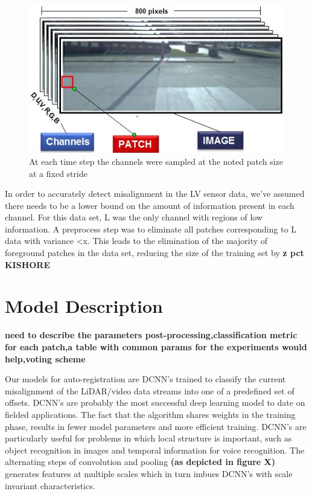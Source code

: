 \documentclass{article}
\begin{document}
\begin{figure}[htbp]
        \includegraphics[scale=0.65]{Figures/ImagePatchChannel.jpg}
    \caption{At each time step the channels were sampled at the noted patch size at a fixed stride}
    \label{fig:ImageChStride}
\end{figure}

In order to accurately detect misalignment in the LV sensor data, we've assumed there needs to be a lower bound on the amount of information present in each channel. For this data set, L was the only channel with regions of low information. A preprocess step was to eliminate all patches corresponding to L data with variance <x. This leads to the elimination of the majority of foreground patches in the data set, reducing the size of the training set by \textbf{z pct KISHORE}



\section{Model Description} %
\label{sec:model_description}

\textbf{need to describe the parameters post-processing,classification metric for each patch,a table with common params for the experiments would help,voting scheme}

Our models for auto-registration are DCNN's trained to classify the current misalignment of the LiDAR/video data streams into one of a predefined set of offsets. DCNN's are probably the most successful deep learning model to date on fielded applications. The fact that the algorithm shares weights in the training phase, results in fewer model parameters and more efficient training. DCNN's are particularly useful for problems in which local structure is important, such as object recognition in images and temporal information for voice recognition. The alternating steps of convolution and pooling \textbf{(as depicted in figure X)}  generates features at multiple scales which in turn imbues DCNN's with scale invariant characteristics.
\end{document}
